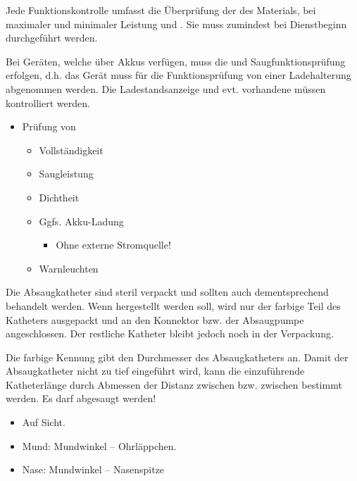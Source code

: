 {
Jede Funktionskontrolle umfasst die Überprüfung der  des
Materials,  bei maximaler und minimaler Leistung und
. Sie muss zumindest bei Dienstbeginn durchgeführt werden.

Bei Geräten, welche über Akkus verfügen, muss die  und
Saugfunktionsprüfung 
erfolgen, d.h. das Gerät muss für die Funktionsprüfung von einer Ladehalterung
abgenommen werden. Die Ladestandsanzeige und evt. vorhandene
 müssen kontrolliert werden. }{
\begin{itemize}
   \item Prüfung von
   \begin{itemize}
      \item Vollständigkeit
      \item Saugleistung
      \item Dichtheit
      \item Ggfs. Akku-Ladung
      \begin{itemize}
         \item Ohne externe Stromquelle!
      \end{itemize}
      \item Warnleuchten
   \end{itemize}
\end{itemize}
}{}{}{}

{
Die Absaugkatheter sind steril verpackt und sollten
auch dementsprechend behandelt werden. Wenn 
 hergestellt werden soll, wird nur
der farbige Teil des Katheters ausgepackt und an den
Konnektor bzw.  der Absaugpumpe angeschlossen.
Der restliche Katheter bleibt jedoch noch in der Verpackung. 

Die farbige Kennung gibt
den Durchmesser des Absaugkatheters an. Damit der
Absaugkatheter nicht zu tief eingeführt wird, kann die
einzuführende Katheterlänge durch Abmessen der Distanz
zwischen  bzw. zwischen  bestimmt werden. Es darf  abgesaugt
werden! }{
\begin{itemize}
    \item Auf Sicht.
    \item Mund: Mundwinkel -- Ohrläppchen.
    \item Nase: Mundwinkel -- Nasenspitze
\end{itemize}
}
{}
{}
{}

